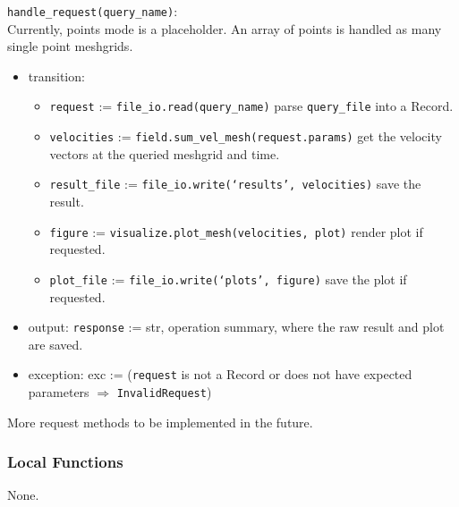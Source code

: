 \documentclass[12pt, titlepage]{article}
\begin{document}
\noindent \texttt{handle\_request(query\_name)}:\\
\noindent Currently, points mode is a placeholder. An array of points is handled as many single point meshgrids.
\begin{itemize}
\item transition:
  \begin{itemize}
    \item \texttt{request} := \texttt{file\_io.read(query\_name)} parse \texttt{query\_file} into a Record.
    \item \texttt{velocities} := \texttt{field.sum\_vel\_mesh(request.params)} get the velocity vectors at the queried meshgrid and time.
    \item \texttt{result\_file} := \texttt{file\_io.write(`results', velocities)} save the result.
    \item \texttt{figure} := \texttt{visualize.plot\_mesh(velocities, plot)} render plot if requested.
    \item \texttt{plot\_file} := \texttt{file\_io.write(`plots', figure)} save the plot if requested.
  \end{itemize}
\item output: \texttt{response} := str, operation summary, where the raw result and plot are saved.
\item exception: exc := (\texttt{request} is not a Record or does not have expected parameters $\Rightarrow$ \texttt{InvalidRequest})
\end{itemize}
\noindent More request methods to be implemented in the future.



\subsubsection{Local Functions}


None.
\end{document}
